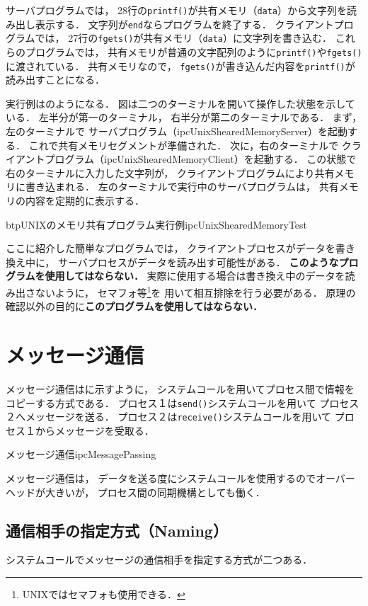 サーバプログラムでは，
28行の{\tt printf()}が共有メモリ（{\tt data}）から文字列を読み出し表示する．
文字列が{\tt end}ならプログラムを終了する．
クライアントプログラムでは，
27行の{\tt fgets()}が共有メモリ（{\tt data}）に文字列を書き込む．
これらのプログラムでは，
共有メモリが普通の文字配列のように{\tt printf()}や{\tt fgets()}に渡されている．
共有メモリなので，
{\tt fgets()}が書き込んだ内容を{\tt printf()}が読み出すことになる．

実行例はのようになる．
図は二つのターミナルを開いて操作した状態を示している．
左半分が第一のターミナル，
右半分が第二のターミナルである．
まず，左のターミナルで
サーバプログラム（ipcUnixShearedMemoryServer）を起動する．
これで共有メモリセグメントが準備された．
次に，右のターミナルで
クライアントプログラム（ipcUnixShearedMemoryClient）を起動する．
この状態で右のターミナルに入力した文字列が，
クライアントプログラムにより共有メモリに書き込まれる．
左のターミナルで実行中のサーバプログラムは，
共有メモリの内容を定期的に表示する．

\begin{myfig}{btp}{UNIXのメモリ共有プログラム実行例}{ipcUnixShearedMemoryTest}

\end{myfig}

ここに紹介した簡単なプログラムでは，
クライアントプロセスがデータを書き換え中に，
サーバプロセスがデータを読み出す可能性がある．
{\bf このようなプログラムを使用してはならない．}
実際に使用する場合は書き換え中のデータを読み出さないように，
セマフォ等\footnote{UNIXではセマフォも使用できる．}を
用いて相互排除を行う必要がある．
原理の確認以外の目的に{\bf このプログラムを使用してはならない．}

\section{メッセージ通信}
メッセージ通信はに示すように，
システムコールを用いてプロセス間で情報をコピーする方式である．
プロセス１は{\tt send()}システムコールを用いて
プロセス２へメッセージを送る．
プロセス２は{\tt receive()}システムコールを用いて
プロセス１からメッセージを受取る．

{メッセージ通信}{ipcMessagePassing}

メッセージ通信は，
データを送る度にシステムコールを使用するのでオーバーヘッドが大きいが，
プロセス間の同期機構としても働く．

\subsection{通信相手の指定方式（Naming）}
システムコールでメッセージの通信相手を指定する方式が二つある．

